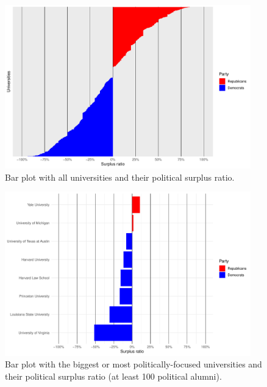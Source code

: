 \documentclass{article}
\begin{document}
\begin{figure}[b]
    \centering
    \includegraphics[width=0.95\textwidth]{images/1 surplus_barplot_no_cutoff_full_scale.pdf}
    \caption{Bar plot with all universities and their political surplus ratio.}
    \label{fig:1}
\end{figure}

\begin{figure}[b]
    \centering
    \includegraphics[width=0.95\textwidth]{images/2 surplus_barplot_cutoff=100_full_scale.pdf}
    \caption{Bar plot with the biggest or most politically-focused universities and their political surplus ratio (at least 100 political alumni).}
    \label{fig:2}
\end{figure}
\end{document}
